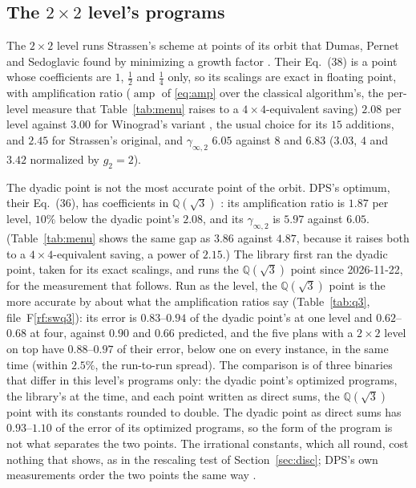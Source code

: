 \documentclass[11pt]{article}
\newcommand{\rf}[1]{F\ref{rf:#1}}
\newcommand{\ginf}{\gamma_{\infty,2}}
\newcommand{\amp}{\operatorname{amp}}
\begin{document}
\subsection{The $2\times2$ level's programs}\label{sec:sw}

The $2\times2$ level runs Strassen's scheme \cite{Strassen69} at points of
its orbit that Dumas, Pernet and Sedoglavic found by minimizing a growth
factor \cite{DPS24}.  Their Eq.~(38) is a point whose coefficients are $1$,
$\frac12$ and $\frac14$ only, so its scalings are exact in floating point,
with amplification ratio ($\amp$ of \eqref{eq:amp} over the classical
algorithm's, the per-level measure that Table~\ref{tab:menu} raises to a
$4\times4$-equivalent saving) $2.08$ per level against $3.00$ for Winograd's
variant \cite{Winograd71}, the usual choice for its $15$ additions, and
$2.45$ for Strassen's original, and $\ginf$ $6.05$ against $8$ and $6.83$
($3.03$, $4$ and $3.42$ normalized by $g_2=2$).

The dyadic point is not the most accurate point of the orbit.  DPS's optimum,
their Eq.~(36), has coefficients in $\mathbb{Q}(\sqrt3)$ \cite{DPS24}: its amplification
ratio is $1.87$ per level, $10\%$ below the dyadic point's $2.08$, and its
$\ginf$ is $5.97$ against $6.05$.  (Table~\ref{tab:menu} shows the same gap
as $3.86$ against $4.87$, because it raises both to a $4\times4$-equivalent
saving, a power of $2.15$.)  The library first ran the dyadic point, taken
for its exact scalings, and runs the $\mathbb{Q}(\sqrt3)$ point since
2026-11-22, for the measurement that follows.  Run as the level, the $\mathbb{Q}(\sqrt3)$ point is the more accurate
by about what the amplification ratios say (Table~\ref{tab:q3},
file~\rf{swq3}): its error is $0.83$--$0.94$ of the dyadic point's at one
level and $0.62$--$0.68$ at four, against $0.90$ and $0.66$ predicted, and
the five plans with a $2\times2$ level on top have $0.88$--$0.97$ of their
error, below one on every instance, in the same time (within $2.5\%$, the
run-to-run spread).  The comparison is of three binaries that differ in
this level's programs only: the dyadic point's optimized programs, the
library's at the time, and each point written as direct
sums, the $\mathbb{Q}(\sqrt3)$ point with its constants rounded to double.
The dyadic point as direct sums has $0.93$--$1.10$ of the error of its
optimized programs, so the form of the program is not what
separates the two points.  The irrational constants, which all round, cost
nothing that shows, as in the rescaling test of Section~\ref{sec:disc}; DPS's
own measurements order the two points the same way \cite[Figure~1]{DPS24}.
\end{document}
